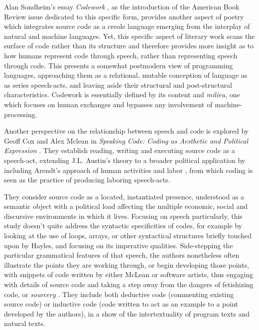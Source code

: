Alan Sondheim's essay \emph{Codework} \citep{sondheim_introduction_2001}, as the introduction of the American Book Review issue dedicated to this specific form, provides another aspect of poetry which integrates source code as a creole language emerging from the interplay of natural and machine languages. Yet, this specific aspect of literary work scans the surface of code rather than its structure and therefore provides more insight as to how humans represent code through speech, rather than representing speech through code. This presents a somewhat postmodern view of programming languages, approaching them as a relational, mutable conception of language as as series speech-acts, and leaving aside their structural and post-structural characteristics. Codework is essentially defined by its content and \emph{milieu}, one which focuses on human exchanges and bypasses any involvement of machine-processing.

Another perspective on the relationship between speech and code is explored by Geoff Cox and Alex Mclean in \emph{Speaking Code: Coding as Aesthetic and Political Expression} \citep{cox_speaking_2013}. They establish reading, writing and executing source code as a speech-act, extending J.L. Austin's theory to a broader political application by including Arendt's approach of human activities and labor \citep{arendt_human_1998}, from which coding is seen as the practice of producing laboring speech-acts.

They consider source code as a located, instantiated presence, understood as a semantic object with a political load affecting the multiple economic, social and discursive environments in which it lives. Focusing on speech particularly, this study doesn't quite address the syntactic specificities of codes, for example by looking at the use of loops, arrays, or other syntactical structures briefly touched upon by Hayles, and focusing on its imperative qualities. Side-stepping the particular grammatical features of that speech, the authors nonetheless often illustrate the points they are working through, or begin developing those points, with snippets of code written by either McLean or software artists, thus engaging with details of source code and taking a step away from the dangers of fetishizing code, or \emph{sourcery} \citep{chun_sourcery_2008}. They include both deductive code (commenting existing source code) or inductive code (code written to act as an example to a point developed by the authors), in a show of the intertextuality of program texts and natural texts.


